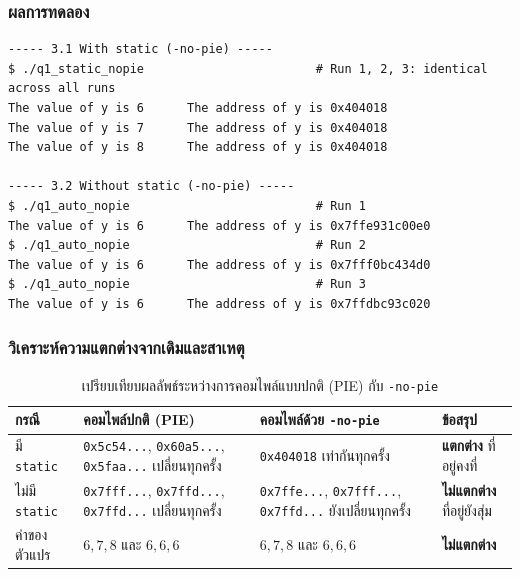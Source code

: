 \documentclass[a4paper,11pt]{article}
\newcommand{\code}[1]{\texttt{#1}}
\begin{document}
\subsubsection{ผลการทดลอง}

\begin{lstlisting}[style=terminal,caption={ผลการทดลอง Step 4 เมื่อใช้แฟล็ก \code{-no-pie}}]
----- 3.1 With static (-no-pie) -----
$ ./q1_static_nopie                        # Run 1, 2, 3: identical across all runs
The value of y is 6      The address of y is 0x404018
The value of y is 7      The address of y is 0x404018
The value of y is 8      The address of y is 0x404018

----- 3.2 Without static (-no-pie) -----
$ ./q1_auto_nopie                          # Run 1
The value of y is 6      The address of y is 0x7ffe931c00e0
$ ./q1_auto_nopie                          # Run 2
The value of y is 6      The address of y is 0x7fff0bc434d0
$ ./q1_auto_nopie                          # Run 3
The value of y is 6      The address of y is 0x7ffdbc93c020
\end{lstlisting}

\subsubsection{วิเคราะห์ความแตกต่างจากเดิมและสาเหตุ}

\begin{table}[H]
\centering\small
\caption{เปรียบเทียบผลลัพธ์ระหว่างการคอมไพล์แบบปกติ (PIE) กับ \code{-no-pie}}
\begin{tabular}{p{2.4cm}p{4.2cm}p{4.2cm}p{3.2cm}}
\toprule
\textbf{กรณี} & \textbf{คอมไพล์ปกติ (PIE)} & \textbf{คอมไพล์ด้วย \code{-no-pie}} & \textbf{ข้อสรุป} \\
\midrule
มี \code{static} & \code{0x5c54...}, \code{0x60a5...}, \code{0x5faa...} เปลี่ยนทุกครั้ง & \code{0x404018} เท่ากันทุกครั้ง & \textbf{แตกต่าง} ที่อยู่คงที่ \\
ไม่มี \code{static} & \code{0x7fff...}, \code{0x7ffd...}, \code{0x7ffd...} เปลี่ยนทุกครั้ง & \code{0x7ffe...}, \code{0x7fff...}, \code{0x7ffd...} ยังเปลี่ยนทุกครั้ง & \textbf{ไม่แตกต่าง} ที่อยู่ยังสุ่ม \\
ค่าของตัวแปร & $6,7,8$ และ $6,6,6$ & $6,7,8$ และ $6,6,6$ & \textbf{ไม่แตกต่าง} \\
\bottomrule
\end{tabular}
\end{table}
\end{document}
